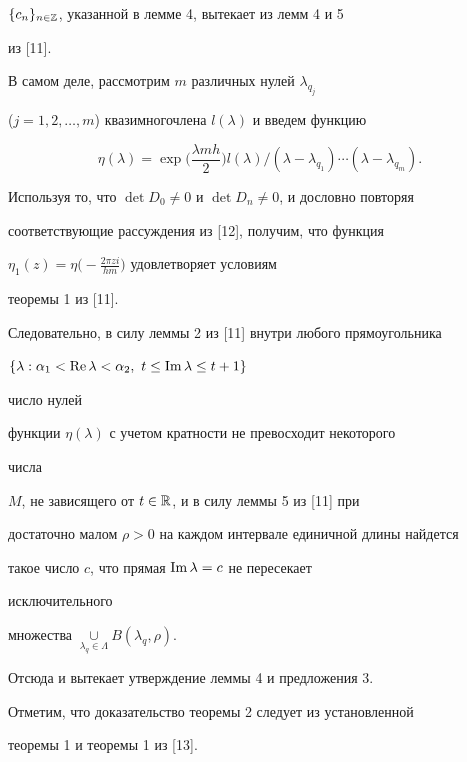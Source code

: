 $\{c_n\}_{n\in\Bbb Z}$, указанной в лемме 4, вытекает из лемм 4 и 5 


из [11]. 


 


В самом деле, рассмотрим $m$ различных нулей $\lambda_{q_j}$ 


($j=1,2,\dotsc,m$) квазимногочлена $l(\lambda)$ и введем функцию 


$$ 


\eta(\lambda)=\exp\bigg(\frac{\lambda m h}{2}\bigg) 


l(\lambda)\Big/(\lambda-\lambda_{q_1})\dotsb(\lambda-\lambda_{q_m}). 


$$ 


 


Используя то, что $\det D_0\ne0$ и $\det D_n\ne0$, и дословно повторяя 


соответствующие рассуждения из [12], получим, что функция 


$\eta_1(z)=\eta\big(-\frac{2\pi z i}{h m}\big)$ удовлетворяет условиям 


теоремы 1 из [11]. 


 


Следовательно, в силу леммы 2 из [11] внутри любого прямоугольника 


$\{\lambda:\alpha_1<\re\lambda<\alpha_2,\ t\le\im\lambda\le t+1\}$ 


число нулей 


функции $\eta(\lambda)$ с учетом кратности не превосходит некоторого 


числа 


$M$, не зависящего от $t\in\Bbb R$, и в силу леммы 5 из [11] при 


достаточно малом $\rho>0$ на каждом интервале единичной длины найдется 


такое число $c$, что прямая $\operatorname{Im}\lambda=c$ не пересекает 


исключительного 


множества $\mathop{\cup}\limits_{\lambda_q\in\Lambda}B(\lambda_q,\rho)$. 


Отсюда и вытекает утверждение леммы 4 и предложения 3. 


 


Отметим, что доказательство теоремы 2 следует из установленной 


теоремы 1 и теоремы 1 из [13]. 


